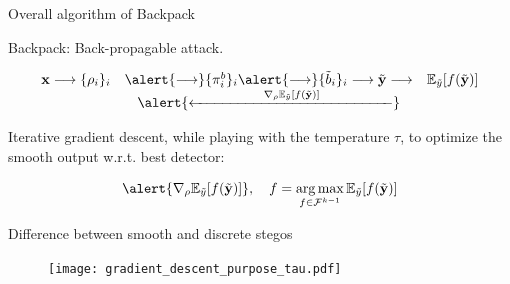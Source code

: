 \documentclass[10pt,aspectratio=169]{beamer}
\DeclareMathOperator*{\argmax}{arg\,max}
\begin{document}
\begin{frame}{Overall algorithm of Backpack}


    \alert{Backpack}: \alert{Back-p}ropagable att\alert{ack}.

    \begin{equation*}
        \begin{array}{ccc}
            \mathbf{x} \longrightarrow \{\rho_i\}_i & \alert{\longrightarrow}  \{\pi_i^b\}_i    \alert{\longrightarrow} \{\tilde{b}_i\}_i \longrightarrow  \tilde{\mathbf{y}}  \longrightarrow  & \mathbb{E}_{\tilde{y}}[f(\tilde{\mathbf{y}})] \\
            & \alert{\xleftarrow{\hspace{5em} \nabla_\rho \mathbb{E}_{\tilde{y}} [f(\tilde{\mathbf{y}})]\hspace{5em}}} 
        \end{array}
    \end{equation*}

    \pause
    Iterative gradient descent, while playing with the temperature $\tau$, to optimize the smooth output w.r.t. best detector:

    \begin{equation}
        \alert{\nabla_\rho \mathbb{E}_{\tilde{y}} [f(\tilde{\mathbf{y}})]}, \quad  f = \argmax_{f \in \mathcal{F}^{k-1}} \mathbb{E}_{\tilde{y}} [f(\tilde{\mathbf{y}})]
    \end{equation}

\end{frame}

\begin{frame}{Difference between smooth and discrete stegos}
    \begin{minipage}[t]{.75\textwidth}
        \begin{figure}[h]
            \texttt{[image: gradient\_descent\_purpose\_tau.pdf]}
        \end{figure}
    \end{minipage}  

    \begin{minipage}[t]{.2\textwidth}
        
    \end{minipage}  
\end{frame}
\end{document}
